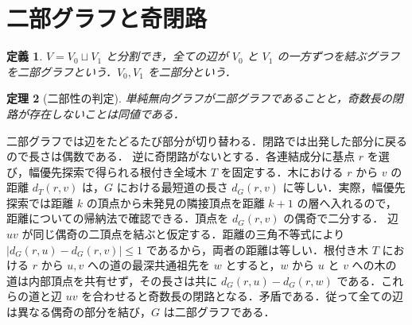 \documentclass[a5paper,10pt,onecolumn]{jsarticle}
\makeatletter
\theoremstyle{mathnotetheorem}
\newtheorem{theorem}{定理}[section]
\newtheorem{definition}[theorem]{定義}
\renewcommand{\proofname}{証明}
\renewenvironment{proof}[1][\proofname]{%
  \par\pushQED{\qed}\normalfont\topsep4\p@\@plus2\p@\relax
  \trivlist\item[\hskip\labelsep\bfseries #1]\ignorespaces
}{\popQED\endtrivlist\@endpefalse}
\makeatother
\begin{document}
\section{二部グラフと奇閉路}
\begin{definition}
$V=V_0\sqcup V_1$ と分割でき，全ての辺が $V_0$ と $V_1$ の一方ずつを結ぶグラフを\emph{二部グラフ}という．$V_0,V_1$ を二部分という．
\end{definition}
\begin{theorem}[二部性の判定]\label{thm:bipartite}
単純無向グラフが二部グラフであることと，奇数長の閉路が存在しないことは同値である．
\end{theorem}
\begin{proof}
二部グラフでは辺をたどるたび部分が切り替わる．閉路では出発した部分に戻るので長さは偶数である．
逆に奇閉路がないとする．各連結成分に基点 $r$ を選び，幅優先探索で得られる根付き全域木 $T$ を固定する．木における $r$ から $v$ の距離 $d_T(r,v)$ は，$G$ における最短道の長さ $d_G(r,v)$ に等しい．実際，幅優先探索では距離 $k$ の頂点から未発見の隣接頂点を距離 $k+1$ の層へ入れるので，距離についての帰納法で確認できる．頂点を $d_G(r,v)$ の偶奇で二分する．
辺 $uv$ が同じ偶奇の二頂点を結ぶと仮定する．距離の三角不等式により $|d_G(r,u)-d_G(r,v)|\le1$ であるから，両者の距離は等しい．根付き木 $T$ における $r$ から $u,v$ への道の最深共通祖先を $w$ とすると，$w$ から $u$ と $v$ への木の道は内部頂点を共有せず，その長さは共に $d_G(r,u)-d_G(r,w)$ である．これらの道と辺 $uv$ を合わせると奇数長の閉路となる．矛盾である．従って全ての辺は異なる偶奇の部分を結び，$G$ は二部グラフである．
\end{proof}
\end{document}
